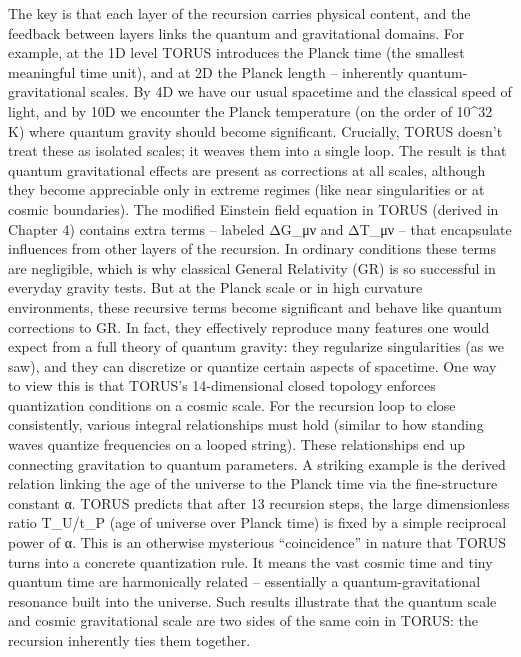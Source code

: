 \documentclass[
]{article}
\begin{document}
The key is that each layer of the recursion carries physical content,
and the feedback between layers links the quantum and gravitational
domains. For example, at the 1D level TORUS introduces the Planck time
(the smallest meaningful time unit), and at 2D the Planck length --
inherently quantum-gravitational scales. By 4D we have our usual
spacetime and the classical speed of light, and by 10D we encounter the
Planck temperature (on the order of 10\^{}32 K) where quantum gravity
should become significant. Crucially, TORUS doesn't treat these as
isolated scales; it weaves them into a single loop. The result is that
quantum gravitational effects are present as corrections at all scales,
although they become appreciable only in extreme regimes (like near
singularities or at cosmic boundaries). The modified Einstein field
equation in TORUS (derived in Chapter 4) contains extra terms -- labeled
ΔG\_μν and ΔT\_μν -- that encapsulate influences from other layers of
the recursion. In ordinary conditions these terms are negligible, which
is why classical General Relativity (GR) is so successful in everyday
gravity tests. But at the Planck scale or in high curvature
environments, these recursive terms become significant and behave like
quantum corrections to GR. In fact, they effectively reproduce many
features one would expect from a full theory of quantum gravity: they
regularize singularities (as we saw), and they can discretize or
quantize certain aspects of spacetime. One way to view this is that
TORUS's 14-dimensional closed topology enforces quantization conditions
on a cosmic scale. For the recursion loop to close consistently, various
integral relationships must hold (similar to how standing waves quantize
frequencies on a looped string). These relationships end up connecting
gravitation to quantum parameters. A striking example is the derived
relation linking the age of the universe to the Planck time via the
fine-structure constant α. TORUS predicts that after 13 recursion steps,
the large dimensionless ratio T\_U/t\_P (age of universe over Planck
time) is fixed by a simple reciprocal power of α. This is an otherwise
mysterious ``coincidence'' in nature that TORUS turns into a concrete
quantization rule. It means the vast cosmic time and tiny quantum time
are harmonically related -- essentially a quantum-gravitational
resonance built into the universe. Such results illustrate that the
quantum scale and cosmic gravitational scale are two sides of the same
coin in TORUS: the recursion inherently ties them together.
\end{document}
